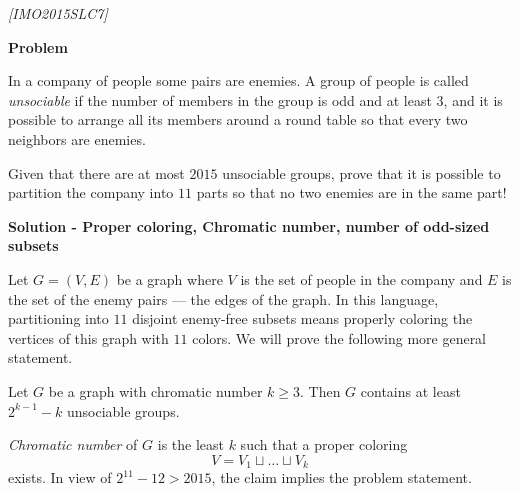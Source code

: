\begin{problem}
\textit{[IMO2015SLC7]}

\textbf{Problem}


In a company of people some pairs are enemies. A group of people is called \textit{unsociable} if the number of members in the group is odd and at least $3$, and it is possible to arrange all its members around a round table so that every two neighbors are enemies. 

Given that there are at most $2015$ unsociable groups, prove that it is possible to partition the company into $11$ parts so that no two enemies are in the same part!

\textbf{Solution - Proper coloring, Chromatic number, number of odd-sized subsets}

Let $G = (V, E)$ be a graph where $V$ is the set of people in the company and $E$ is the set of the enemy pairs — the edges of the graph. In this language, partitioning into $11$ disjoint enemy-free subsets means properly coloring the vertices of this graph with $11$ colors. We will prove the following more general statement.

\begin{claim} Let $G$ be a graph with chromatic number $k \geq  3$. Then $G$ contains at least $2^{k-1} - k$ unsociable groups.
\end{claim}

\textit{Chromatic number} of $G$ is the least $k$ such that a proper coloring 
\begin{equation}
\label{propcoloring}
V = V_1 \sqcup \dots \sqcup V_k
\end{equation}
exists. In view of $2^{11} - 12 > 2015$, the claim implies the problem statement. 


\end{problem}

